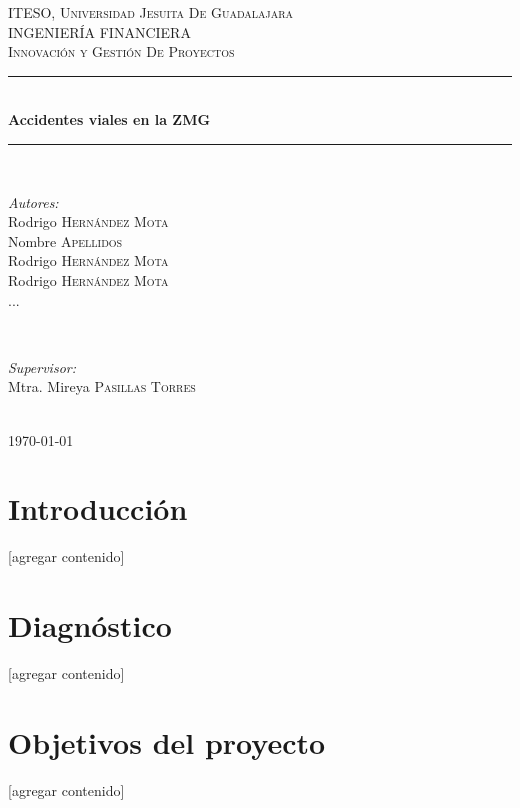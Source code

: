 \documentclass{article}
\begin{document}
\begin{titlepage}
\newcommand{\HRule}{\rule{\linewidth}{0.5mm}}

\center
\textsc{\LARGE ITESO, Universidad Jesuita De Guadalajara}\\[2cm]
\textsc{\Large INGENIERÍA FINANCIERA}\\[1cm]
\textsc{\large Innovación y Gestión De Proyectos}\\[1cm]
\HRule \\[2cm]
{ \huge \bfseries Accidentes viales en la ZMG}\\[2cm] 
\HRule \\[2cm]
\begin{minipage}{0.4\textwidth}
\begin{flushleft} \large


\emph{Autores:}\\
Rodrigo \textsc{Hernández Mota}\\
Nombre \textsc{Apellidos}\\
Rodrigo \textsc{Hernández Mota}\\
Rodrigo \textsc{Hernández Mota}\\
...
\end{flushleft}
\end{minipage}
~
\begin{minipage}{0.4\textwidth}
\begin{flushright} \large
\emph{Supervisor:} \\
Mtra. Mireya \textsc{Pasillas Torres}
\end{flushright}
\end{minipage}\\[2cm]

{\large \today}\\[1cm]

\vfill
 
\end{titlepage}
\tableofcontents
\newpage

\section{Introducción}\label{sec:into}
[agregar contenido]

\section{Diagnóstico}\label{sec:diagnostic}
[agregar contenido]

\section{Objetivos del proyecto}\label{sec:objs}
[agregar contenido]
\end{document}
